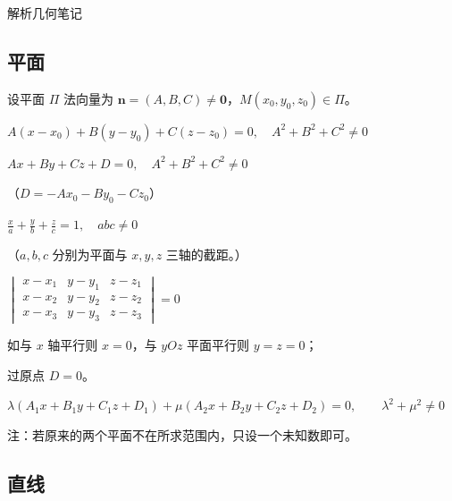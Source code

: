 \documentclass[UTF8,fontset=fandol,zihao=5]{ctexart}
\begin{document}
\begin{center}
  {\heiti\headingfont{}\color{main} 解析几何笔记}
\end{center}

\subsection{平面}

设平面 $\Pi$ 法向量为 $\bm n=(A,B,C)\ne\bm 0$，$M(x_0,y_0,z_0)\in\Pi$。

\begin{description}[style=multiline,leftmargin=7em,labelwidth=6em,itemsep=0.65em]
  \item[点法式方程]
  $A(x-x_0)+B(y-y_0)+C(z-z_0)=0,\quad A^2+B^2+C^2\ne0$

  \item[一般式方程]
  $Ax+By+Cz+D=0,\quad A^2+B^2+C^2\ne0$

  \hfill（$D=-Ax_0-By_0-Cz_0$）

  \item[截距式方程]
  $\displaystyle\frac{x}{a}+\frac{y}{b}+\frac{z}{c}=1,\quad abc\ne0$

  \hfill（$a,b,c$ 分别为平面与 $x,y,z$ 三轴的截距。）

  \item[三点式方程]
  $\displaystyle
  \begin{vmatrix}
    x-x_1 & y-y_1 & z-z_1\\
    x-x_2 & y-y_2 & z-z_2\\
    x-x_3 & y-y_3 & z-z_3
  \end{vmatrix}=0$
\end{description}

\begin{method}[【注意】与谁平行谁为零]
如与 $x$ 轴平行则 $x=0$，与 $yOz$ 平面平行则 $y=z=0$；

过原点 $D=0$。
\end{method}

\begin{description}[style=multiline,leftmargin=7em,labelwidth=6em]
  \item[平面束方程]
  $\lambda(A_1x+B_1y+C_1z+D_1)+\mu(A_2x+B_2y+C_2z+D_2)=0,\qquad\lambda^2+\mu^2\ne0$

  注：若原来的两个平面不在所求范围内，只设一个未知数即可。
\end{description}

\subsection{直线}
\end{document}
